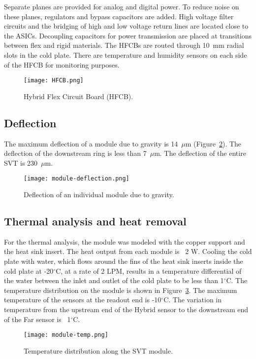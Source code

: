 Separate planes are provided for analog and digital power. To reduce noise on these planes, regulators and bypass capacitors are added. High voltage filter circuits and the bridging of high and low voltage return lines are located close to the ASICs. Decoupling capacitors for power transmission are placed at transitions between flex and rigid materials. The HFCBs are routed through 10~mm radial slots in the cold plate. There are temperature and humidity sensors on each side of the HFCB for monitoring purposes.

\begin{figure}[hbt] 
\texttt{[image: HFCB.png]}
\caption{Hybrid Flex Circuit Board (HFCB).}
\label{fig:HFCB}
\end{figure}

\subsection{Deflection}

The maximum deflection of a module due to gravity is 14~$\mu$m (Figure~\ref{fig:module-deflection}). The deflection of the downstream ring is less than 7~$\mu$m. The deflection of the entire SVT is 230~$\mu$m.

\begin{figure}[hbt] 
\texttt{[image: module-deflection.png]}
\caption{Deflection of an individual module due to gravity.}
\label{fig:module-deflection}
\end{figure}

\subsection{Thermal analysis and heat removal}

For the thermal analysis, the module was modeled with the copper support and the heat sink insert. The heat output from each module is ~2 W. Cooling the cold plate with water, which flows around the fins of the heat sink inserts inside the cold plate at -20$^\circ$C, at a rate of 2 LPM, results in a temperature differential of the water between the inlet and outlet of the cold plate to be less than 1$^\circ$C. The temperature distribution on the module is shown in Figure~\ref{fig:module-temp}. The maximum temperature of the sensors at the readout end is -10$^\circ$C. The variation in temperature from the upstream end of the Hybrid sensor to the downstream end of the Far sensor is ~1$^\circ$C.

\begin{figure}[hbt] 
\centering 
\texttt{[image: module-temp.png]}
\caption{Temperature distribution along the SVT module.}
\label{fig:module-temp}
\end{figure}

